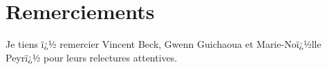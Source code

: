 \section*{Remerciements}

Je tiens ï¿½ remercier Vincent Beck, Gwenn Guichaoua et Marie-Noï¿½lle Peyrï¿½ pour leurs relectures attentives. 


